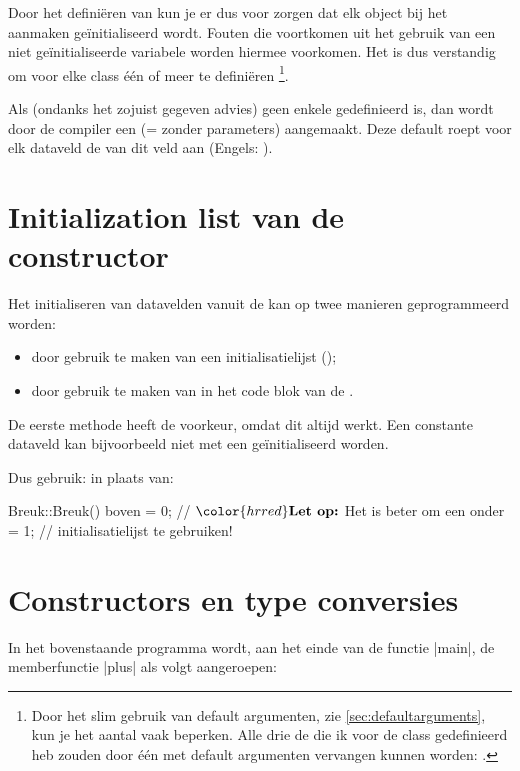 \begin{cpplstShortInline}
Door het definiëren van  kun je er dus voor zorgen dat elk object bij het aanmaken geïnitialiseerd wordt. 
Fouten die voortkomen uit het gebruik van een niet geïnitialiseerde variabele worden hiermee voorkomen. 
Het is dus verstandig om voor elke class één of meer  te definiëren%
\footnote{%
    Door het slim gebruik van default argumenten, zie \cref{sec:defaultarguments}, kun je het aantal  vaak beperken. 
    Alle drie de  die ik voor de class  gedefinieerd heb zouden door één  met default argumenten vervangen kunnen worden:
    .
}.

Als (ondanks het zojuist gegeven advies) geen enkele  gedefinieerd is, dan wordt door de compiler een \label{defaultconstructor}\emph{} (=  zonder parameters) aangemaakt. Deze default  roept voor elk dataveld de  van dit veld aan (Engels: \emph{}).

\section{Initialization list van de constructor}
Het initialiseren van datavelden vanuit de  kan op twee manieren geprogrammeerd worden:
\begin{itemize}
    \item door gebruik te maken van een initialisatielijst (\emph{});
    \item door gebruik te maken van  in het code blok van de .
\end{itemize}
De eerste methode heeft de voorkeur, omdat dit altijd werkt. Een constante dataveld kan bijvoorbeeld niet met een  geïnitialiseerd worden.

Dus gebruik:
in plaats van:
\begin{cpplstfragment}[mathescape=true]
Breuk::Breuk() {
    boven = 0; // $\color{hrred}\textbf{Let op:}$ Het is beter om een 
    onder = 1; // initialisatielijst te gebruiken!
}
\end{cpplstfragment}

\section{Constructors en type conversies}
\label{sec:conversieconstructor}
In het bovenstaande programma wordt, aan het einde van de functie |main|, de memberfunctie |plus| als volgt aangeroepen:


\end{cpplstShortInline}
